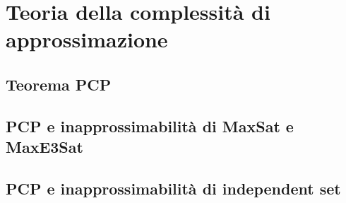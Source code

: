 \section{Teoria della complessità di approssimazione}

\subsection{Teorema PCP}
\subsection{PCP e inapprossimabilità di MaxSat e MaxE3Sat}
\subsection{PCP e inapprossimabilità di independent set}
